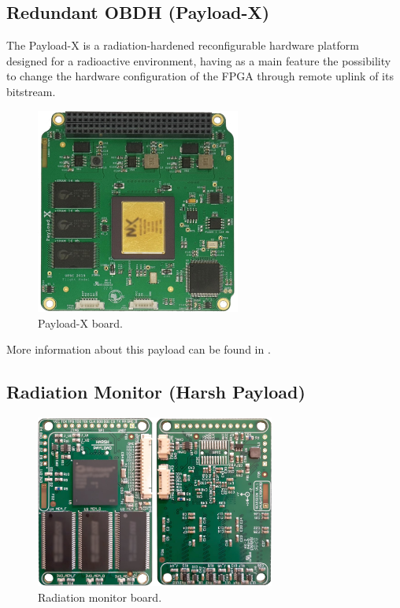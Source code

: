 \subsection{Redundant OBDH (Payload-X)}

The Payload-X is a radiation-hardened reconfigurable hardware platform designed for a radioactive environment, having as a main feature the possibility to change the hardware configuration of the FPGA through remote uplink of its bitstream.

\begin{figure}[!ht]
    \begin{center}
        \includegraphics[width=0.6\textwidth]{figures/payload-x-board}
        \caption{Payload-X board.}
        \label{fig:payload-x-board}
    \end{center}
\end{figure}

More information about this payload can be found in \cite{rigo2019}.

\subsection{Radiation Monitor (Harsh Payload)}

\begin{figure}[!ht]
    \begin{center}
        \includegraphics[width=0.7\textwidth]{figures/harsh-payload}
        \caption{Radiation monitor board.}
        \label{fig:harsh-payload}
    \end{center}
\end{figure}

